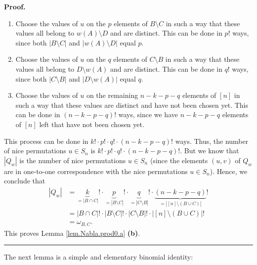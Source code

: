 \documentclass[numbers=enddot,12pt,final,onecolumn,notitlepage]{scrartcl}%
\numberwithin{exer}{subsection}
\theoremstyle{definition}
\newenvironment{proof}[1][Proof]{\noindent\textbf{#1.} }{\ \rule{0.5em}{0.5em}}
\begin{document}
\begin{proof}
\begin{enumerate}
\item Choose the values of $u$ on the $p$ elements of $B\setminus C$ in such a
way that these values all belong to $w\left(  A\right)  \setminus D$ and are
distinct. This can be done in $p!$ ways, since both $\left\vert B\setminus
C\right\vert $ and $\left\vert w\left(  A\right)  \setminus D\right\vert $
equal $p$.

\item Choose the values of $u$ on the $q$ elements of $C\setminus B$ in such a
way that these values all belong to $D\setminus w\left(  A\right)  $ and are
distinct. This can be done in $q!$ ways, since both $\left\vert C\setminus
B\right\vert $ and $\left\vert D\setminus w\left(  A\right)  \right\vert $
equal $q$.

\item Choose the values of $u$ on the remaining $n-k-p-q$ elements of $\left[
n\right]  $ in such a way that these values are distinct and have not been
chosen yet. This can be done in $\left(  n-k-p-q\right)  !$ ways, since we
have $n-k-p-q$ elements of $\left[  n\right]  $ left that have not been chosen yet.
\end{enumerate}

This process can be done in $k!\cdot p!\cdot q!\cdot\left(  n-k-p-q\right)  !$
ways. Thus, the number of nice permutations $u\in S_{n}$ is $k!\cdot p!\cdot
q!\cdot\left(  n-k-p-q\right)  !$. But we know that $\left\vert Q_{w}%
\right\vert $ is the number of nice permutations $u\in S_{n}$ (since the
elements $\left(  u,v\right)  $ of $Q_{w}$ are in one-to-one correspondence
with the nice permutations $u\in S_{n}$). Hence, we conclude that%
\begin{align*}
\left\vert Q_{w}\right\vert  &  =\underbrace{k}_{=\left\vert B\cap
C\right\vert }!\cdot\underbrace{p}_{=\left\vert B\setminus C\right\vert
}!\cdot\underbrace{q}_{=\left\vert C\setminus B\right\vert }!\cdot
\underbrace{\left(  n-k-p-q\right)  }_{=\left\vert \left[  n\right]
\setminus\left(  B\cup C\right)  \right\vert }!\\
&  =\left\vert B\cap C\right\vert !\cdot\left\vert B\setminus C\right\vert
!\cdot\left\vert C\setminus B\right\vert !\cdot\left\vert \left[  n\right]
\setminus\left(  B\cup C\right)  \right\vert !\\
&  =\omega_{B,C}.
\end{align*}
This proves Lemma \ref{lem.Nabla.prod0.a} \textbf{(b)}.
\end{proof}

The next lemma is a simple and elementary binomial identity:
\end{document}
